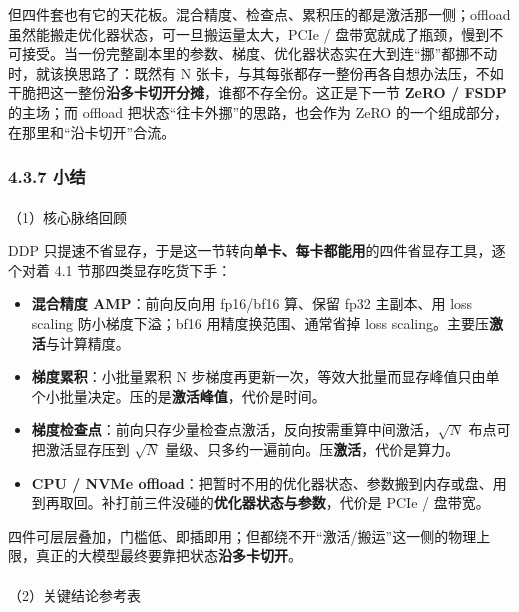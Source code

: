 \documentclass[
  chinese,
]{ctexart}
\makeatletter
\let\oldparagraph\paragraph
\renewcommand{\paragraph}{
    \@ifstar
      \xxxParagraphStar
      \xxxParagraphNoStar
  }
\newcommand{\xxxParagraphStar}[1]{\oldparagraph*{#1}\mbox{}}
\newcommand{\xxxParagraphNoStar}[1]{\oldparagraph{#1}\mbox{}}
\providecommand{\tightlist}{%
  \setlength{\itemsep}{0pt}\setlength{\parskip}{0pt}}
\makeatother
\begin{document}
但四件套也有它的天花板。混合精度、检查点、累积压的都是激活那一侧；offload
虽然能搬走优化器状态，可一旦搬运量太大，PCIe /
盘带宽就成了瓶颈，慢到不可接受。当一份完整副本里的参数、梯度、优化器状态实在大到连``挪''都挪不动时，就该换思路了：既然有
N
张卡，与其每张都存一整份再各自想办法压，不如干脆把这一整份\textbf{沿多卡切开分摊}，谁都不存全份。这正是下一节
\textbf{ZeRO / FSDP} 的主场；而 offload
把状态``往卡外挪''的思路，也会作为 ZeRO
的一个组成部分，在那里和``沿卡切开''合流。

\subsubsection{4.3.7 小结}\label{ux5c0fux7ed3-2}

\paragraph{（1）核心脉络回顾}\label{ux6838ux5fc3ux8109ux7edcux56deux987e-2}

DDP
只提速不省显存，于是这一节转向\textbf{单卡、每卡都能用}的四件省显存工具，逐个对着
4.1 节那四类显存吃货下手：

\begin{itemize}
\tightlist
\item
  \textbf{混合精度 AMP}：前向反向用 fp16/bf16 算、保留 fp32 主副本、用
  loss scaling 防小梯度下溢；bf16 用精度换范围、通常省掉 loss
  scaling。主要压\textbf{激活}与计算精度。
\item
  \textbf{梯度累积}：小批量累积 N
  步梯度再更新一次，等效大批量而显存峰值只由单个小批量决定。压的是\textbf{激活峰值}，代价是时间。
\item
  \textbf{梯度检查点}：前向只存少量检查点激活，反向按需重算中间激活，\(\sqrt N\)
  布点可把激活显存压到 \(\sqrt N\)
  量级、只多约一遍前向。压\textbf{激活}，代价是算力。
\item
  \textbf{CPU / NVMe
  offload}：把暂时不用的优化器状态、参数搬到内存或盘、用到再取回。补打前三件没碰的\textbf{优化器状态与参数}，代价是
  PCIe / 盘带宽。
\end{itemize}

四件可层层叠加，门槛低、即插即用；但都绕不开``激活/搬运''这一侧的物理上限，真正的大模型最终要靠把状态\textbf{沿多卡切开}。

\paragraph{（2）关键结论参考表}\label{ux5173ux952eux7ed3ux8bbaux53c2ux8003ux8868-1}
\end{document}
